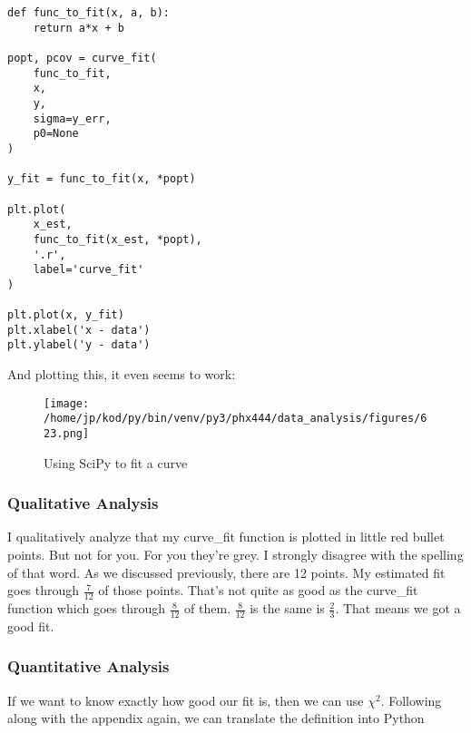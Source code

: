 \documentclass{article}
\begin{document}
\begin{center}
\begin{minipage}[t]{.75\textwidth}
\begin{lstlisting}[frame=tlrb]
def func_to_fit(x, a, b):
    return a*x + b

popt, pcov = curve_fit(
    func_to_fit,
    x,
    y,
    sigma=y_err,
    p0=None
)

y_fit = func_to_fit(x, *popt)

plt.plot(
    x_est,
    func_to_fit(x_est, *popt),
    '.r',
    label='curve_fit'
)

plt.plot(x, y_fit)
plt.xlabel('x - data')
plt.ylabel('y - data')
\end{lstlisting}
\end{minipage}
\end{center}
And plotting this, it even seems to work:
\begin{figure}[H]
        \begin{center}
        \texttt{[image: /home/jp/kod/py/bin/venv/py3/phx444/data\_analysis/figures/623.png]}
        \caption{Using SciPy to fit a curve}
        \label{fig:fig_18}
        \end{center}
\end{figure}

\subsubsection{Qualitative Analysis}
I qualitatively analyze that my curve\_fit function is plotted in little red
bullet points. But not for you. For you they're grey. I strongly disagree with
the spelling of that word. As we discussed previously, there are 12 points. My
estimated fit goes through $\frac{7}{12}$ of those points. That's not quite as
good as the curve\_fit function which goes through $\frac{8}{12}$ of them.
$\frac{8}{12}$ is the same is $\frac{2}{3}$. That means we got a good fit. 

\subsubsection{Quantitative Analysis}
If we want to know exactly how good our fit is, then we can use $\chi^2$.
Following along with the appendix again, we can translate the definition into
Python
\end{document}
